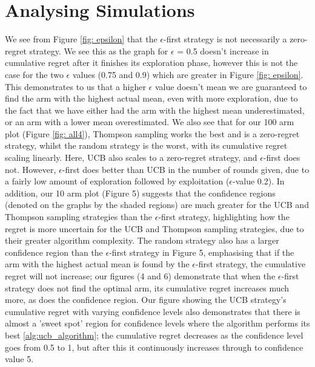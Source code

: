 \section{Analysing Simulations}\label{sec:analysing-simulations}
We see from Figure \ref{fig: epsilon} that the $\epsilon$-first strategy is not necessarily a zero-regret strategy.
We see this as the graph for $\epsilon$ = 0.5 doesn't increase in cumulative regret after it finishes its exploration phase, however this is not the case for the two $\epsilon$ values (0.75 and 0.9) which are greater in Figure \ref{fig: epsilon}.
This demonstrates to us that a higher $\epsilon$ value doesn't mean we are guaranteed to find the arm with the highest actual mean, even with more exploration, due to the fact that we have either had the arm with the highest mean underestimated, or an arm with a lower mean overestimated.
\newline
We also see that for our 100 arm plot (Figure \ref{fig: all4}), Thompson sampling works the best and is a zero-regret strategy, whilst the random strategy is the worst, with its cumulative regret scaling linearly.
Here, UCB also scales to a zero-regret strategy, and $\epsilon$-first does not.
However, $\epsilon$-first does better than UCB in the number of rounds given, due to a fairly low amount of exploration followed by exploitation ($\epsilon$-value 0.2).
\newline
In addition, our 10 arm plot (Figure 5) suggests that the confidence regions (denoted on the graphs by the shaded regions) are much greater for the UCB and Thompson sampling strategies than the $\epsilon$-first strategy, highlighting how the regret is more uncertain for the UCB and Thompson sampling strategies, due to their greater algorithm complexity.
The random strategy also has a larger confidence region than the $\epsilon$-first strategy in Figure 5, emphasising that if the arm with the highest actual mean is found by the $\epsilon$-first strategy, the cumulative regret will not increase;
our figures (4 and 6) demonstrate that when the $\epsilon$-first strategy does not find the optimal arm, its cumulative regret increases much more, as does the confidence region.
\newline
Our figure showing the UCB strategy's cumulative regret with varying confidence levels also demonstrates that there is almost a 'sweet spot' region for confidence levels where the algorithm performs its best \ref{alg:ucb_algorithm};
the cumulative regret decreases as the confidence level goes from 0.5 to 1, but after this it continuously increases through to confidence value 5.
